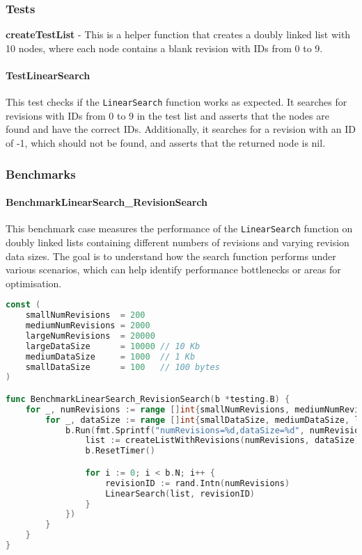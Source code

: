 \subsubsection*{Tests}

\textbf{createTestList} - This is a helper function that creates a doubly linked list with 10 nodes, where each node contains a blank revision with IDs from 0 to 9.

\paragraph{TestLinearSearch}
This test checks if the \lstinline{LinearSearch} function works as expected. It searches for revisions with IDs from 0 to 9 in the test list and asserts that the nodes are found and have the correct IDs. Additionally, it searches for a revision with an ID of -1, which should not be found, and asserts that the returned node is nil.

\subsubsection*{Benchmarks}

\paragraph{BenchmarkLinearSearch\_RevisionSearch}
This benchmark case measures the performance of the \lstinline{LinearSearch} function on doubly linked lists containing different numbers of revisions and varying revision data sizes. The goal is to understand how the search function performs under various scenarios, which can help identify performance bottlenecks or areas for optimisation.

\begin{lstlisting}[language=go]
const (
	smallNumRevisions  = 200
	mediumNumRevisions = 2000
	largeNumRevisions  = 20000
	largeDataSize      = 10000 // 10 Kb
	mediumDataSize     = 1000  // 1 Kb
	smallDataSize      = 100   // 100 bytes
)

func BenchmarkLinearSearch_RevisionSearch(b *testing.B) {
	for _, numRevisions := range []int{smallNumRevisions, mediumNumRevisions, largeNumRevisions} {
		for _, dataSize := range []int{smallDataSize, mediumDataSize, largeDataSize} {
			b.Run(fmt.Sprintf("numRevisions=%d,dataSize=%d", numRevisions, dataSize), func(b *testing.B) {
				list := createListWithRevisions(numRevisions, dataSize)
				b.ResetTimer()

				for i := 0; i < b.N; i++ {
					revisionID := rand.Intn(numRevisions)
					LinearSearch(list, revisionID)
				}
			})
		}
	}
}
\end{lstlisting}
\medskip

